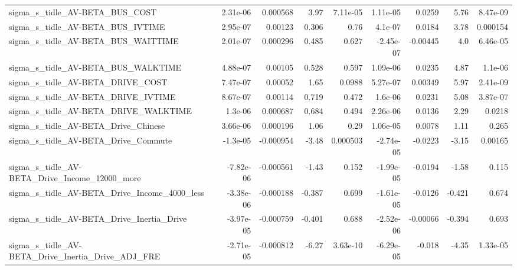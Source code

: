 \begin{tabular}{lrrrrrrrr}
sigma\_s\_tidle\_AV-BETA\_BUS\_COST                     &    2.31e-06 &     0.000568 &     3.97 & 7.11e-05 &   1.11e-05 &      0.0259 &         5.76 &      8.47e-09 \\
sigma\_s\_tidle\_AV-BETA\_BUS\_IVTIME                   &    2.95e-07 &      0.00123 &    0.306 &     0.76 &    4.1e-07 &      0.0184 &         3.78 &      0.000154 \\
sigma\_s\_tidle\_AV-BETA\_BUS\_WAITTIME                 &    2.01e-07 &     0.000296 &    0.485 &    0.627 &  -2.45e-07 &    -0.00445 &          4.0 &      6.46e-05 \\
sigma\_s\_tidle\_AV-BETA\_BUS\_WALKTIME                 &    4.88e-07 &      0.00105 &    0.528 &    0.597 &   1.09e-06 &      0.0235 &         4.87 &       1.1e-06 \\
sigma\_s\_tidle\_AV-BETA\_DRIVE\_COST                   &    7.47e-07 &      0.00052 &     1.65 &   0.0988 &   5.27e-07 &     0.00349 &         5.97 &      2.41e-09 \\
sigma\_s\_tidle\_AV-BETA\_DRIVE\_IVTIME                 &    8.67e-07 &      0.00114 &    0.719 &    0.472 &    1.6e-06 &      0.0231 &         5.08 &      3.87e-07 \\
sigma\_s\_tidle\_AV-BETA\_DRIVE\_WALKTIME               &     1.3e-06 &     0.000687 &    0.684 &    0.494 &   2.26e-06 &      0.0136 &         2.29 &        0.0218 \\
sigma\_s\_tidle\_AV-BETA\_Drive\_Chinese                &    3.66e-06 &     0.000196 &     1.06 &     0.29 &   1.06e-05 &      0.0078 &         1.11 &         0.265 \\
sigma\_s\_tidle\_AV-BETA\_Drive\_Commute                &    -1.3e-05 &    -0.000954 &    -3.48 & 0.000503 &  -2.74e-05 &     -0.0223 &        -3.15 &       0.00165 \\
sigma\_s\_tidle\_AV-BETA\_Drive\_Income\_12000\_more      &   -7.82e-06 &    -0.000561 &    -1.43 &    0.152 &  -1.99e-05 &     -0.0194 &        -1.58 &         0.115 \\
sigma\_s\_tidle\_AV-BETA\_Drive\_Income\_4000\_less       &   -3.38e-06 &    -0.000188 &   -0.387 &    0.699 &  -1.61e-05 &     -0.0126 &       -0.421 &         0.674 \\
sigma\_s\_tidle\_AV-BETA\_Drive\_Inertia\_Drive          &   -3.97e-05 &    -0.000759 &   -0.401 &    0.688 &  -2.52e-06 &    -0.00066 &       -0.394 &         0.693 \\
sigma\_s\_tidle\_AV-BETA\_Drive\_Inertia\_Drive\_ADJ\_FRE  &   -2.71e-05 &    -0.000812 &    -6.27 & 3.63e-10 &  -6.29e-05 &      -0.018 &        -4.35 &      1.33e-05 \\

\end{tabular}
